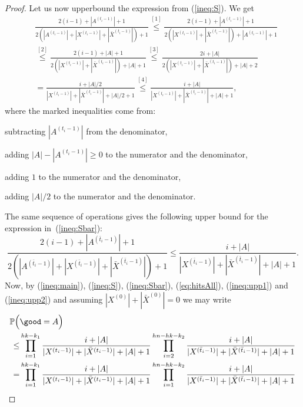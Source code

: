 \documentclass[runningheads, envcountsame, smallextended]{llncs}
\newcommand{\pr}{{\mathbb P}}
\numberwithin{theorem}{section}
\numberwithin{definition}{section}
\numberwithin{lemma}{section}
\numberwithin{corollary}{section}
\numberwithin{proposition}{section}
\numberwithin{conjecture}{section}
\numberwithin{remark}{section}
\numberwithin{equation}{section}
\begin{document}
\begin{proof}
	Let us now upperbound the expression from (\ref{ineq:S}). We get
	\begin{equation} \label{ineq:upp1}
		\begin{split}
			& \frac{2(i-1)+|A^{(t_i-1)}|+1}{2(|A^{(t_i-1)}|+|X^{(t_i-1)}|+|\bar{X}^{(t_i-1)}|)+1} 
			\overset{[1]}\leq \frac{2(i-1)+|A^{(t_i-1)}|+1}{2(|X^{(t_i-1)}|+|\bar{X}^{(t_i-1)}|)+|A^{(t_i-1)}|+1} \\ 
			& \overset{[2]}\leq \frac{2(i-1)+|A|+1}{2(|X^{(t_i-1)}|+|\bar{X}^{(t_i-1)}|)+|A|+1}
			\overset{[3]}\leq \frac{2i+|A|}{2(|X^{(t_i-1)}|+|\bar{X}^{(t_i-1)}|)+|A|+2} \\
			& = \frac{i+|A|/2}{|X^{(t_i-1)}|+|\bar{X}^{(t_i-1)}|+|A|/2+1}
			\overset{[4]}\leq \frac{i+|A|}{|X^{(t_i-1)}|+|\bar{X}^{(t_i-1)}|+|A|+1},
		\end{split}
	\end{equation}
	where the marked inequalities come from:
	\begin{enumerate}[label={[\arabic*]}]
		\item subtracting $|A^{(t_i-1)}|$ from the denominator,
		\item adding $|A|-|A^{(t_i-1)}|\geq 0$ to the numerator and the denominator,
		\item adding $1$ to the numerator and the denominator,
		\item adding $|A|/2$ to the numerator and the denominator.
	\end{enumerate}
	The same sequence of operations gives the following upper bound for the expression in~(\ref{ineq:Sbar}):
	\begin{equation} \label{ineq:upp2}
		\frac{2(i-1)+|A^{(\bar{t}_i-1)}|+1}{2(|A^{(\bar{t}_i-1)}|+|X^{(\bar{t}_i-1)}|+|\bar{X}^{(\bar{t}_i-1)}|)+1} \leq \frac{i+|A|}{|X^{(\bar{t}_i-1)}|+|\bar{X}^{(\bar{t}_i-1)}|+|A|+1}.
	\end{equation}
	Now, by (\ref{ineq:main}), (\ref{ineq:S}), (\ref{ineq:Sbar}), (\ref{eq:hitsAll}), (\ref{ineq:upp1}) and (\ref{ineq:upp2}) and assuming $|X^{(0)}|+|\bar{X}^{(0)}|=0$ we may write
	\begin{equation} \label{ineq:interm}
		\begin{split}
			\pr\Big(&\good =  A \Big) \\
			\leq & \prod_{i = 1}^{hk-k_1} \frac{i+|A|}{|X^{(t_i-1)}|+|\bar{X}^{(t_i-1)}|+|A|+1}  \prod_{i=2}^{hn-hk-k_2} \frac{i+|A|}{|X^{(\bar{t}_i-1)}|+|\bar{X}^{(\bar{t}_i-1)}|+|A|+1}\\
			= &  \prod_{i = 1}^{hk-k_1} \frac{i+|A|}{|X^{(t_i-1)}|+|\bar{X}^{(t_i-1)}|+|A|+1} \prod_{i=1}^{hn-hk-k_2} \frac{i+|A|}{|X^{(\bar{t}_i-1)}|+|\bar{X}^{(\bar{t}_i-1)}|+|A|+1}\\

\end{split}
\end{equation}
\end{proof}
\end{document}
